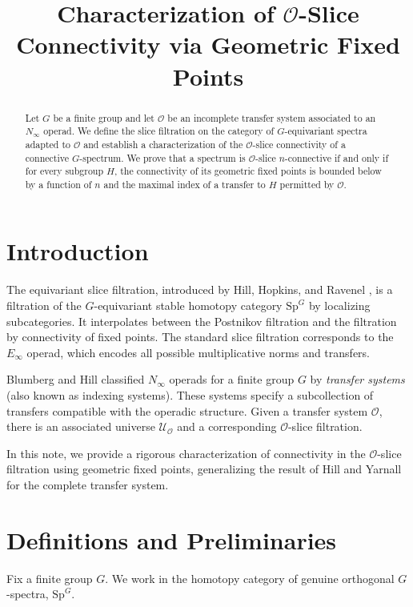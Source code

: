 \documentclass[11pt]{article}
\title{Characterization of $\mathcal{O}$-Slice Connectivity via Geometric Fixed Points}
\author{}
\date{}
\theoremstyle{plain}
\theoremstyle{definition}
\newcommand{\Ocal}{\mathcal{O}}
\newcommand{\SpG}{\mathrm{Sp}^G}
\begin{document}
\maketitle

\begin{abstract}
    Let $G$ be a finite group and let $\Ocal$ be an incomplete transfer system associated to an $N_\infty$ operad. We define the slice filtration on the category of $G$-equivariant spectra adapted to $\Ocal$ and establish a characterization of the $\Ocal$-slice connectivity of a connective $G$-spectrum. We prove that a spectrum is $\Ocal$-slice $n$-connective if and only if for every subgroup $H$, the connectivity of its geometric fixed points is bounded below by a function of $n$ and the maximal index of a transfer to $H$ permitted by $\Ocal$.
\end{abstract}

\section{Introduction}

The equivariant slice filtration, introduced by Hill, Hopkins, and Ravenel \cite{HHR16}, is a filtration of the $G$-equivariant stable homotopy category $\SpG$ by localizing subcategories. It interpolates between the Postnikov filtration and the filtration by connectivity of fixed points. The standard slice filtration corresponds to the $E_\infty$ operad, which encodes all possible multiplicative norms and transfers.

Blumberg and Hill \cite{BH15} classified $N_\infty$ operads for a finite group $G$ by \emph{transfer systems} (also known as indexing systems). These systems specify a subcollection of transfers compatible with the operadic structure. Given a transfer system $\Ocal$, there is an associated universe $\mathcal{U}_\Ocal$ and a corresponding $\Ocal$-slice filtration.

In this note, we provide a rigorous characterization of connectivity in the $\Ocal$-slice filtration using geometric fixed points, generalizing the result of Hill and Yarnall \cite{HY18} for the complete transfer system.

\section{Definitions and Preliminaries}

Fix a finite group $G$. We work in the homotopy category of genuine orthogonal $G$-spectra, $\SpG$.
\end{document}
